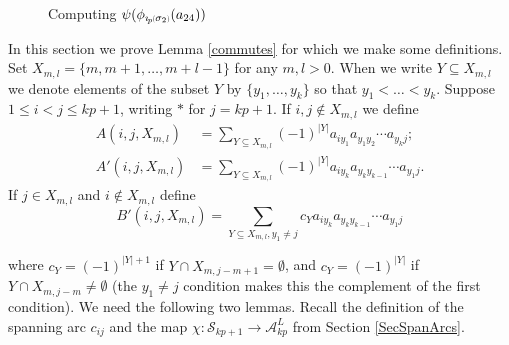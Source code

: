 \documentclass[11pt]{amsart}
\newcommand{\oarc}[4]{
\draw[thick, postaction={on each segment={mid arrow}}] (#1,#2) ..controls (#1 + .2,#2 + .7) and (#3 - .2,#4 + .7) .. (#3,#4);
}
\def\A{{\mathcal A}}
\def\s{{\sigma}}
\newcommand*{\subsmallp}[1]{\scalebox{.5}{\ensuremath#1}}
\newcommand{\subpp}[2][p]{\imath_{\hspace*{-1pt}#1}\hspace*{-.5pt}\subsmallp(#2\subsmallp)}
\theoremstyle{definition}
\begin{document}
{\begin{figure}[ht]
\caption{Computing $\psi(\phi_{\subpp{\s_2}}(a_{24}))$}
\label{FigCommutes}
\end{figure}

}%

\noindent In this section we prove Lemma \ref{commutes} for which we make some definitions.  Set $X_{m,l} = \{m,m+1,\ldots,m+l-1\}$ for any $m,l>0$. When we write $Y\subseteq X_{m,l}$ we denote elements of the subset $Y$ by $\{y_1,\ldots,y_k\}$ so that $y_1<\ldots <y_k$.  Suppose $1\le i< j\le kp+1$, writing $\ast$ for $j=kp+1$. If $i,j\not\in X_{m,l}$ we define
\begin{align*}
   A(i,j,X_{m,l})   &= \sum_{Y\subseteq X_{m,l}}(-1)^{|Y|}a_{iy_1}a_{y_1y_2}\cdots a_{y_kj};\\
   A'(i,j,X_{m,l})  &= \sum_{Y\subseteq X_{m,l}}(-1)^{|Y|}a_{iy_k}a_{y_ky_{k-1}}\cdots a_{y_1j}.
 \end{align*}
If $j\in X_{m,l}$ and $i\not\in X_{m,l}$ define
$$
B'(i,j,X_{m,l}) = \sum_{Y\subseteq X_{m,l}, y_1\ne j}c_Ya_{iy_k}a_{y_ky_{k-1}}\cdots a_{y_1j}
$$

\noindent where $c_Y = (-1)^{|Y|+1}$ if $Y\cap X_{m,j-m+1} = \emptyset$, and $c_Y = (-1)^{|Y|}$ if $Y\cap X_{m,j-m}\ne\emptyset$ (the $y_1\ne j$ condition makes this the complement of the first condition). We need the following two lemmas. Recall the definition of the spanning arc $c_{ij}$ and the map $\chi:\mathscr S_{kp+1}\to\A_{kp}^L$ from Section \ref{SecSpanArcs}.
\end{document}
